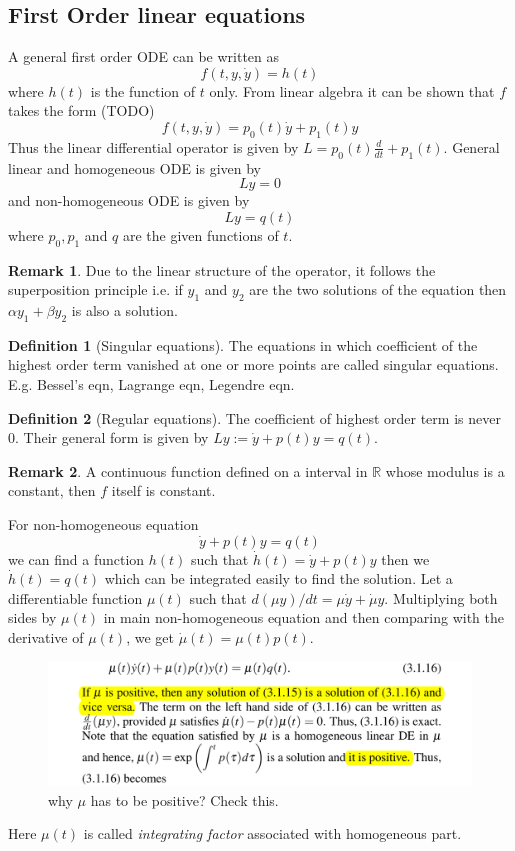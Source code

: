 \documentclass[12pt,reqno]{amsart}
\theoremstyle{plain}
\theoremstyle{definition}
\newtheorem{defn}{Definition}
\newtheorem{rem}{Remark}
\newcommand{\R}{\mathbb{R}}
\begin{document}
\subsection{First Order linear equations}
A general first order ODE can be written as
$$ f(t, y, \dot{y}) = h(t)$$
where $h(t)$ is the function of $t$ only. From linear algebra it can be shown that $f$ takes the form (TODO)
$$ f(t,y,\dot{y}) = p_0(t)\dot{y} + p_1(t)y$$
Thus the linear differential operator is given by $ L = p_0(t)\frac{d}{dt} + p_1(t)$. General linear and homogeneous ODE is given by $$ Ly = 0$$ and non-homogeneous ODE is given by $$ Ly = q(t)$$ where $p_0, p_1$ and $q$ are the given functions of $t$.
\begin{rem}
    Due to the linear structure of the operator, it follows the superposition principle i.e. if $y_1$ and $y_2$ are the two solutions of the equation then $\alpha y_1 + \beta y_2$ is also a solution.
\end{rem}
\begin{defn}[Singular equations]
    The equations in which coefficient of the highest order term vanished at one or more points are called singular equations. E.g. Bessel's eqn, Lagrange eqn, Legendre eqn.
\end{defn}
\begin{defn}[Regular equations]
    The coefficient of highest order term is never $0$. Their general form is given by $Ly := \dot{y} + p(t)y = q(t)$.
\end{defn}
\begin{rem}
    A continuous function defined on a interval in $\R$ whose modulus is a constant, then $f$ itself is constant.  
\end{rem}
\par For non-homogeneous equation
$$ \dot{y} + p(t)y = q(t) $$
we can find a function $h(t)$ such that $ \dot{h}(t) = \dot{y} + p(t)y$ then we $\dot{h}(t) = q(t)$ which can be integrated easily to find the solution. Let a differentiable function $\mu(t)$ such that $d(\mu y) /dt = \mu \dot{y} + \dot{\mu}y$. Multiplying both sides by $\mu(t)$ in main non-homogeneous equation and then comparing with the derivative of $\mu(t)$, we get $\dot{\mu}(t) = \mu(t)p(t)$. 
\begin{figure}[!ht]
    \centerline{\includegraphics[scale=.30]{../assests/integrating_fac.png}}
    \caption{why $\mu$ has to be positive? Check this.}
    \label{fig1}
\end{figure}
Here $\mu(t)$ is called {\it integrating factor} associated with homogeneous part.
\end{document}
